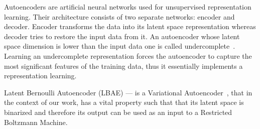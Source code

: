 \documentclass[runningheads]{llncs}
\begin{document}

Autoencoders are artificial neural networks used for unsupervised representation
learning. Their architecture consists of two separate networks: encoder and
decoder. Encoder transforms the data into its latent space representation
whereas decoder tries to restore the input data from it. An autoencoder whose
latent space dimension is lower than the input data one is called
undercomplete~\cite{Goodfellow2016}. Learning an undercomplete representation
forces the autoencoder to capture the most significant features of the training
data, thus it essentially implements a representation learning.



Latent Bernoulli Autoencoder (LBAE) --- is a Variational
Autoencoder~\cite{fajtl2020}, that in the context of our work, has a vital
property such that that its latent space is binarized and therefore its output
can be used as an input to a Restricted Boltzmann Machine.
\end{document}
